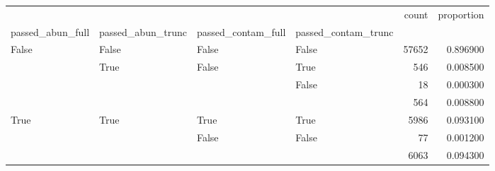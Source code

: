 \begin{tabular}{llllrr}
\toprule
 &  &  &  & count & proportion \\
passed_abun_full & passed_abun_trunc & passed_contam_full & passed_contam_trunc &  &  \\
\midrule
\multirow[t]{4}{*}{False} & False & False & False & 57652 & 0.896900 \\
\cline{2-6} \cline{3-6}
 & \multirow[t]{3}{*}{True} & \multirow[t]{2}{*}{False} & True & 546 & 0.008500 \\
 &  &  & False & 18 & 0.000300 \\
\cline{3-6}
 &  &  &  & 564 & 0.008800 \\
\cline{1-6} \cline{2-6} \cline{3-6}
\multirow[t]{3}{*}{True} & \multirow[t]{3}{*}{True} & True & True & 5986 & 0.093100 \\
\cline{3-6}
 &  & False & False & 77 & 0.001200 \\
\cline{3-6}
 &  &  &  & 6063 & 0.094300 \\
\cline{1-6} \cline{2-6} \cline{3-6}
\bottomrule
\end{tabular}
